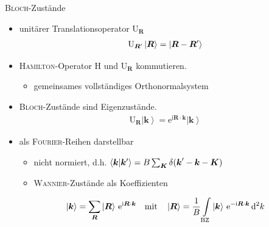 \documentclass{beamer}
\newcommand \ket[1]{\left | #1 \right \rangle}
\newcommand \bracket[2]{\left \langle #1 \middle | #2 \right \rangle}
\def \I {\mathrm i}
\def \E {\mathrm e}
\def \D {\mathrm d}
\def \vec {\boldsymbol}
\newcommand \op[1]{\mathrm{#1}}
\begin{document}
	\begin{frame}{\textsc{Bloch}-Zustände}
		\begin{itemize}
			\item unitärer Translationsoperator $\op U_{\vec R}$
			\begin{align*}
				\op U_{\vec R'} \ket{\vec R} = \ket{\vec R - \vec R\smash'}
			\end{align*}
			\item \textsc{Hamilton}-Operator $\op H$ und $\op U_{\vec R}$ kommutieren.
			\begin{itemize}
				\item gemeinsames vollständiges Orthonormalsystem
			\end{itemize}
			\item \textsc{Bloch}-Zustände sind Eigenzustände.
			\begin{align*}
				\op U_{\vec R} \ket{\vec k} = \E^{\I \vec R \cdot \vec k} \ket{\vec k}
			\end{align*}
			\item als \textsc{Fourier}-Reihen darstellbar
			\begin{itemize}
				\item nicht normiert, d.h. $\bracket{\vec k}{\vec k\smash'} = B \sum_{\vec K} \delta(\vec k' - \vec k - \vec K)$
				\item \textsc{Wannier}-Zustände als Koeffizienten
			\end{itemize}
			\begin{align*}
				\ket{\vec k} = \sum_{\vec R} \ket{\vec R} \, \E^{\I \vec R \cdot \vec k} \quad \text{mit} \quad \ket{\vec R} = \frac 1 B \int \limits_{\rm BZ} \ket{\vec k} \, \E^{-\I \vec R \cdot \vec k} \, \D^2 k
			\end{align*}
		\end{itemize}
	\end{frame}
	
\end{document}
